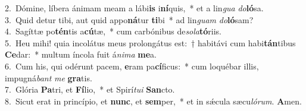 {2.~}Dómine, líbera ánimam meam a lábi\textbf{is} i\textbf{ní}quis,~* et a lin\textit{gua} \textit{do}\textbf{ló}sa.\\
{3.~}Quid detur tibi, aut quid appo\textbf{ná}tur \textbf{ti}bi~* ad lin\textit{guam} \textit{do}\textbf{ló}sam?\\
{4.~}Sagíttæ po\textbf{tén}tis a\textbf{cú}tæ,~* cum carbónibus de\textit{so}\textit{la}\textbf{tó}riis.\\
{5.~}Heu mihi! quia incolátus meus prolongátus est:~† habitávi cum habi\textbf{tán}tibus \textbf{Ce}dar:~* multum íncola fuit á\textit{ni}\textit{ma} \textbf{me}a.\\
{6.~}Cum his, qui odérunt pacem, \textbf{e}ram pa\textbf{cí}ficus:~* cum loquébar illis, impugná\textit{bant} \textit{me} \textbf{gra}tis.\\
{7.~}Glória \textbf{Pa}tri, et \textbf{Fí}lio,~* et Spirí\textit{tu}\textit{i} \textbf{San}cto.\\
{8.~}Sicut erat in princípio, et \textbf{nunc}, et \textbf{sem}per,~* et in sǽcula sæcu\textit{ló}\textit{rum}. \textbf{A}men.\\
